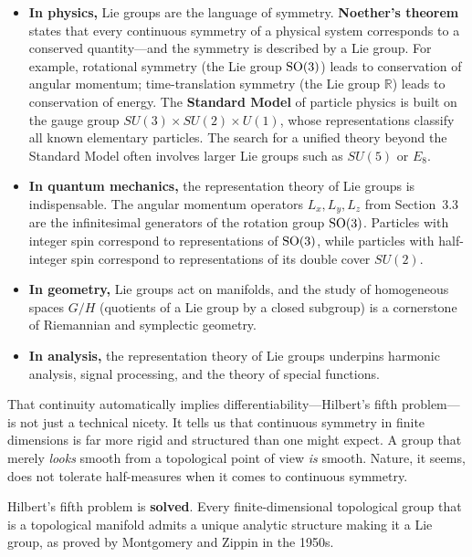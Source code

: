 \begin{itemize}
    \item \textbf{In physics,} Lie groups are the language of symmetry. \textbf{Noether's theorem} states that every continuous symmetry of a physical system corresponds to a conserved quantity---and the symmetry is described by a Lie group. For example, rotational symmetry (the Lie group $\operatorname{SO}(3)$) leads to conservation of angular momentum; time-translation symmetry (the Lie group $\mathbb{R}$) leads to conservation of energy. The \textbf{Standard Model} of particle physics is built on the gauge group $SU(3) \times SU(2) \times U(1)$, whose representations classify all known elementary particles. The search for a unified theory beyond the Standard Model often involves larger Lie groups such as $SU(5)$ or $E_8$.

    \item \textbf{In quantum mechanics,} the representation theory of Lie groups is indispensable. The angular momentum operators $L_x, L_y, L_z$ from Section~3.3 are the infinitesimal generators of the rotation group $\operatorname{SO}(3)$. Particles with integer spin correspond to representations of $\operatorname{SO}(3)$, while particles with half-integer spin correspond to representations of its double cover $SU(2)$.

    \item \textbf{In geometry,} Lie groups act on manifolds, and the study of homogeneous spaces $G/H$ (quotients of a Lie group by a closed subgroup) is a cornerstone of Riemannian and symplectic geometry.

    \item \textbf{In analysis,} the representation theory of Lie groups underpins harmonic analysis, signal processing, and the theory of special functions.
\end{itemize}

That continuity automatically implies differentiability---Hilbert's fifth problem---is not just a technical nicety. It tells us that continuous symmetry in finite dimensions is far more rigid and structured than one might expect. A group that merely \emph{looks} smooth from a topological point of view \emph{is} smooth. Nature, it seems, does not tolerate half-measures when it comes to continuous symmetry.

\begin{solvedbox}
Hilbert's fifth problem is \textbf{solved}. Every finite-dimensional topological group that is a topological manifold admits a unique analytic structure making it a Lie group, as proved by Montgomery and Zippin in the 1950s.
\end{solvedbox}

